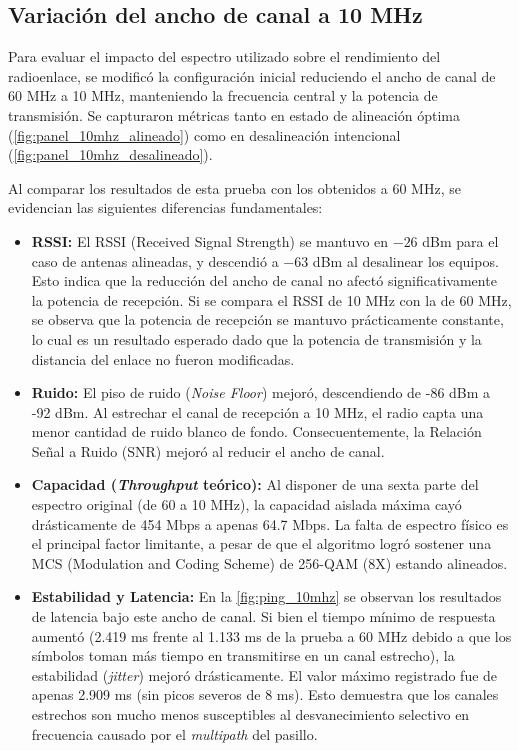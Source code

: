 \subsection{Variación del ancho de canal a 10 MHz}
\label{sec_3.10}

Para evaluar el impacto del espectro utilizado sobre el rendimiento del radioenlace, se modificó la configuración inicial reduciendo el ancho de canal de 60 MHz a 10 MHz, manteniendo la frecuencia central y la potencia de transmisión. Se capturaron métricas tanto en estado de alineación óptima (\autoref{fig:panel_10mhz_alineado}) como en desalineación intencional (\autoref{fig:panel_10mhz_desalineado}).

Al comparar los resultados de esta prueba con los obtenidos a 60 MHz, se evidencian las siguientes diferencias fundamentales:

\begin{itemize}
    \item \textbf{RSSI:} El RSSI (Received Signal Strength) se mantuvo en $-26$ dBm para el caso de antenas alineadas, y descendió a $-63$ dBm al desalinear los equipos. Esto indica que la reducción del ancho de canal no afectó significativamente la potencia de recepción. Si se compara el RSSI de 10 MHz con la de 60 MHz, se observa que la potencia de recepción se mantuvo prácticamente constante, lo cual es un resultado esperado dado que la potencia de transmisión y la distancia del enlace no fueron modificadas.
    \item \textbf{Ruido:} El piso de ruido (\textit{Noise Floor}) mejoró, descendiendo de -86 dBm a -92 dBm. Al estrechar el canal de recepción a 10 MHz, el radio capta una menor cantidad de ruido blanco de fondo. Consecuentemente, la Relación Señal a Ruido (SNR) mejoró al reducir el ancho de canal.
    \item \textbf{Capacidad (\textit{Throughput} teórico):} Al disponer de una sexta parte del espectro original (de 60 a 10 MHz), la capacidad aislada máxima cayó drásticamente de 454 Mbps a apenas 64.7 Mbps. La falta de espectro físico es el principal factor limitante, a pesar de que el algoritmo logró sostener una MCS (Modulation and Coding Scheme) de 256-QAM (8X) estando alineados.
    \item \textbf{Estabilidad y Latencia:} En la \autoref{fig:ping_10mhz} se observan los resultados de latencia bajo este ancho de canal. Si bien el tiempo mínimo de respuesta aumentó (2.419 ms frente al 1.133 ms de la prueba a 60 MHz debido a que los símbolos toman más tiempo en transmitirse en un canal estrecho), la estabilidad (\textit{jitter}) mejoró drásticamente. El valor máximo registrado fue de apenas 2.909 ms (sin picos severos de 8 ms). Esto demuestra que los canales estrechos son mucho menos susceptibles al desvanecimiento selectivo en frecuencia causado por el \textit{multipath} del pasillo.
\end{itemize}

